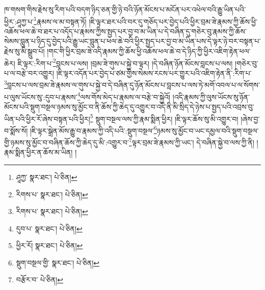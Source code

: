 ཁ་གསག་གིས་རྗེས་སུ་རིག་པའི་བདག་ཉིད་ཅན་གྱི་ཉེ་བའི་ཉོན་མོངས་པ་མངོན་པར་འཕེལ་བའི་རྒྱུ་ཡིན་པའི་ཕྱིར་:ཤཱཀྱ་པ་\footnote{ཤཱཀྱ་  སྣར་ཐང་།  པེ་ཅིན། }རྣམས་ལ་མ་བསྟན་ཏོ། །ཇི་ལྟར་ཐར་པའི་བར་དུ་གཅོད་པར་བྱེད་པའི་ཕྱིར་བྲམ་ཟེ་རྣམས་ཀྱི་ཆོས་ཕྱི་འཆོས་ཕལ་ཆེ་བ་ཐར་པ་འདོད་པ་རྣམས་ཀྱིས་སྤྱད་པར་བྱ་བ་མ་ཡིན་པ་དེ་བཞིན་དུ་གཅེར་བུ་རྣམས་ཀྱི་ཆོས་སེམས་བླུན་པ་ཉིད་དུ་བྱེད་པའི་རྒྱུ་ཡང་བླུན་པ་ཕལ་ཆེ་བའི་ཕྱིར་སྤྱད་པར་བྱ་བ་མ་ཡིན་པས་དེ་ལྟར་ཉེ་བར་བསྟན་པ་རྗེས་སུ་མི་སྒྲུབ་པོ། །གང་གི་ཕྱིར་བྲམ་ཟེ་འདི་རྣམས་ཀྱི་ཆོས་ཕྱི་འཆོས་ཕལ་ཆེ་བ་དེ་ཉིད་ཀྱི་ཕྱིར་འཇིག་རྟེན་ཕལ་ཆེར། ཇི་ལྟར་:རིག་པ་\footnote{རིགས་པ་  སྣར་ཐང་།  པེ་ཅིན། }བླངས་པ་ལས། །བྲམ་ཟེ་གུས་པ་སྐྱེ་བ་ལྟར། །དེ་བཞིན་ཉོན་མོངས་བླངས་པ་ལས། །གཅེར་བུ་པ་ལ་བརྩེ་བར་འགྱུར། །ཇི་ལྟར་འདོན་པར་བྱེད་པ་ཙམ་གྱིས་སེམས་རངས་པར་གྱུར་པའི་འཇིག་རྟེན་ནི་:རིག་པ་\footnote{རིགས་པ་  སྣར་ཐང་།  པེ་ཅིན། }བླངས་པ་ལས་བྲམ་ཟེ་རྣམས་ལ་གུས་པ་སྐྱེ་བ་དེ་བཞིན་དུ་ཉོན་མོངས་པ་བླངས་པ་ལས་ཏེ་མགོ་འབལ་པ་ལ་སོགས་པ་ལུས་ཡོངས་སུ་:དུབ་པ་རྣམས་\footnote{དུབ་པ་  སྣར་ཐང་།  པེ་ཅིན། }ལས་གོས་མེད་པ་རྣམས་ལ་བརྩེ་བ་སྐྱེའོ། །འདི་རྣམས་ཀྱི་ལུས་ཡོངས་སུ་ཉོན་མོངས་པའི་སྡུག་བསྔལ་ཉམས་སུ་མྱོང་བ་ནི་ཆོས་ཀྱི་ཆེད་དུ་འགྱུར་བ་འདི་ནི་མི་སྲིད་དེ་ཉེས་པ་སྤྱད་པའི་འབྲས་བུ་ཡིན་པའི་ཕྱིར་རོ་ཞེས་བསྟན་པའི་ཕྱིར།\footnote{ཕྱིར་རོ།  སྣར་ཐང་།  པེ་ཅིན། } སྡུག་བསྔལ་ལས་ཀྱི་རྣམ་སྨིན་ཕྱིར། །ཇི་ལྟར་ཆོས་སུ་མི་འགྱུར་བ། །ཞེས་བྱ་བ་སྨོས་སོ། །ཇི་ལྟར་སྒྲེན་མོས་རྒྱུ་བ་རྣམས་ཀྱི་འདི་པའི་:སྡུག་བསྔལ་\footnote{སྡུག་བསྔལ་གྱི་  སྣར་ཐང་།  པེ་ཅིན། }ཉམས་སུ་མྱོང་བ་ཡང་དམྱལ་བའི་སྡུག་བསྔལ་གྱི་ཉམས་སུ་མྱོང་བ་བཞིན་ཆོས་ཀྱི་ཆེད་དུ་མི་:འགྱུར་བ་\footnote{བརྩོར་བ་  པེ་ཅིན། }ལྟར་བྲམ་ཟེ་རྣམས་ཀྱི་ཡང་། དེ་བཞིན་སྐྱེ་བ་ལས་ཀྱི་ནི། །རྣམ་སྨིན་ཕྱིར་ན་ཆོས་མ་ཡིན། །
